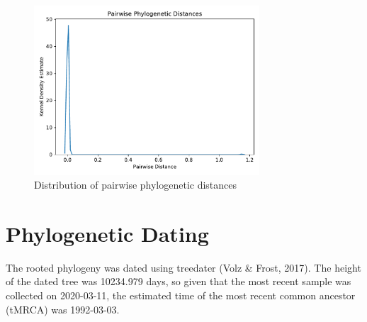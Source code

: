 \documentclass{article}
\begin{document}
\begin{figure}[h]
\centering
\includegraphics[width=0.75\textwidth,keepaspectratio]{./figs/pairwise_distances_tree.pdf}
\caption{Distribution of pairwise phylogenetic distances}
\end{figure}

\section{Phylogenetic Dating}
The rooted phylogeny was dated using treedater (Volz \& Frost, 2017).
The height of the dated tree was 10234.979 days,
so given that the most recent sample was collected on 2020-03-11,
the estimated time of the most recent common ancestor (tMRCA) was 1992-03-03.
\end{document}
